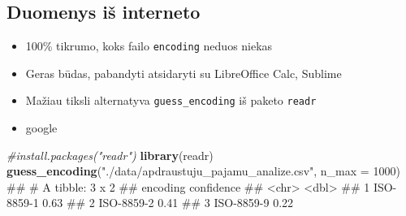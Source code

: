 \documentclass[]{article}
\newenvironment{Shaded}{\begin{snugshade}}{\end{snugshade}}
\newcommand{\KeywordTok}[1]{\textcolor[rgb]{0.13,0.29,0.53}{\textbf{#1}}}
\newcommand{\DataTypeTok}[1]{\textcolor[rgb]{0.13,0.29,0.53}{#1}}
\newcommand{\DecValTok}[1]{\textcolor[rgb]{0.00,0.00,0.81}{#1}}
\newcommand{\FloatTok}[1]{\textcolor[rgb]{0.00,0.00,0.81}{#1}}
\newcommand{\StringTok}[1]{\textcolor[rgb]{0.31,0.60,0.02}{#1}}
\newcommand{\CommentTok}[1]{\textcolor[rgb]{0.56,0.35,0.01}{\textit{#1}}}
\newcommand{\OperatorTok}[1]{\textcolor[rgb]{0.81,0.36,0.00}{\textbf{#1}}}
\newcommand{\NormalTok}[1]{#1}
\providecommand{\tightlist}{%
  \setlength{\itemsep}{0pt}\setlength{\parskip}{0pt}}
\begin{document}
\begin{Shaded}
\end{Shaded}

\subsection{Duomenys iš interneto}\label{duomenys-is-interneto-6}

\begin{itemize}
\tightlist
\item
  100\% tikrumo, koks failo \texttt{encoding} neduos niekas
\item
  Geras būdas, pabandyti atsidaryti su LibreOffice Calc, Sublime
\item
  Mažiau tiksli alternatyva \texttt{guess\_encoding} iš paketo
  \texttt{readr}
\item
  google
\end{itemize}

\begin{Shaded}
\begin{Highlighting}[]
\CommentTok{#install.packages("readr")}
\KeywordTok{library}\NormalTok{(readr)}
\KeywordTok{guess_encoding}\NormalTok{(}\StringTok{"./data/apdraustuju_pajamu_analize.csv"}\NormalTok{, }\DataTypeTok{n_max =} \DecValTok{1000}\NormalTok{)}
\NormalTok{## # A tibble: 3 x 2}
\NormalTok{##   encoding   confidence}
\NormalTok{##   <chr>           <dbl>}
\NormalTok{## 1 ISO-8859-1       0.63}
\NormalTok{## 2 ISO-8859-2       0.41}
\NormalTok{## 3 ISO-8859-9       0.22}
\end{Highlighting}
\end{Shaded}
\end{document}
